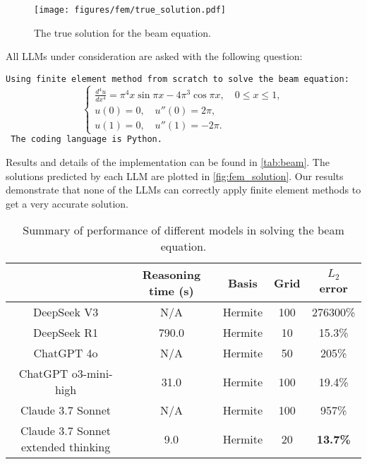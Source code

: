 \documentclass{article}
\begin{document}
\begin{figure}[h!]
    \centering
    \texttt{[image: figures/fem/true\_solution.pdf]}
    \caption{The true solution for the beam equation.}
    \label{fig:beam_true_solution}
\end{figure}

All LLMs under consideration are asked with the following question: 

\texttt{Using finite element method from scratch to solve the beam equation:
\begin{equation*}
\left\{\begin{array}{l}
    \frac{d^4 u}{dx^4} = \pi^4 x \sin \pi x - 4\pi^3 \cos \pi x, \quad 0 \leq x \leq 1,\\ 
    u(0) = 0, \quad u''(0) = 2\pi,\\ 
    u(1) = 0, \quad u''(1) = -2\pi.
\end{array}\right.
\end{equation*}
The coding language is Python.
}

Results and details of the implementation can be found in \autoref{tab:beam}. The solutions predicted by each LLM are plotted in \autoref{fig:fem_solution}. Our results demonstrate that none of the LLMs can correctly apply finite element methods to get a very accurate solution.

\begin{table}[h!]
    \centering
    \renewcommand{\arraystretch}{1.5}
    \caption{Summary of performance of different models in solving the beam equation.}
    \vspace{2mm}
    \begin{tabular}{c|c|c|c|c}
    \toprule
   &Reasoning time (s)& Basis & Grid & $L_{2}$ error\\ 
    \hline 
    DeepSeek V3     &N/A& Hermite &100 & 276300\% \\
    \hline 
    DeepSeek R1     &790.0&Hermite & 10 & 15.3\%  \\ 
    \hline 
    ChatGPT 4o    &N/A& Hermite & 50 & 205\% \\ 
    \hline 
    ChatGPT o3-mini-high &31.0 & Hermite & 100 & 19.4\% \\
    \hline 
    Claude 3.7 Sonnet &N/A&Hermite & 100 & 957\% \\ 
    \hline 
    Claude 3.7 Sonnet extended thinking &9.0 & Hermite & 20 & \textbf{13.7\%}\\ 
    \bottomrule
    \end{tabular}
    \label{tab:beam}
\end{table}
\end{document}
